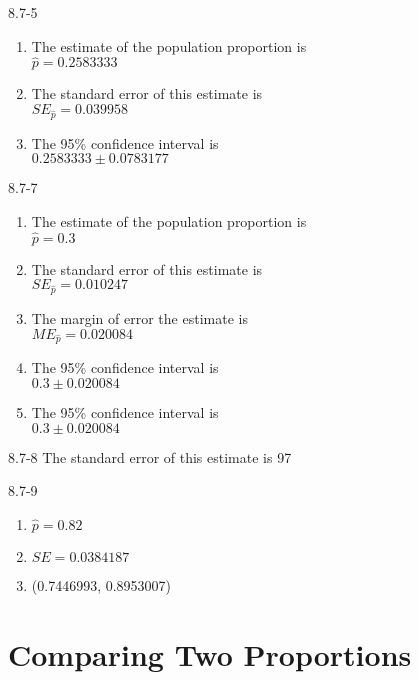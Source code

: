 \begin{exsol@solution}{8.7-5}
\begin{enumerate}
\item	The estimate of the population proportion is \\ $\hat{p} = 0.2583333$
\item	The standard error of this estimate is \\ $SE_{\hat{p}} = 0.039958$
\item	The 95\% confidence interval is \\ $0.2583333 \pm 0.0783177$
\end{enumerate}
\end{exsol@solution}
\begin{exsol@solution}{8.7-7}
\begin{enumerate}
\item	The estimate of the population proportion is \\ $\hat{p} = 0.3$
\item	The standard error of this estimate is \\ $SE_{\hat{p}} = 0.010247$
\item The margin of error the estimate is \\ $ME_{\hat{p}} = 0.020084$
\item	The 95\% confidence interval is \\ $0.3 \pm 0.020084$
\item	The 95\% confidence interval is \\ $0.3 \pm 0.020084$
\end{enumerate}
\end{exsol@solution}
\begin{exsol@solution}{8.7-8}
The standard error of this estimate is 97

\end{exsol@solution}
\begin{exsol@solution}{8.7-9}
\begin{enumerate}
\item $\hat{p} = 0.82$
\item $SE = 0.0384187$
\item (0.7446993, 0.8953007)
\end{enumerate}

\end{exsol@solution}
\setcounter{chapter}{8}\chapter{Comparing Two Proportions }

